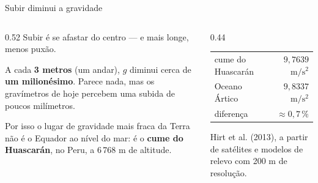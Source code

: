 \documentclass[aspectratio=169,11pt]{beamer}
\newcommand{\bnum}[1]{\textbf{\textcolor{mTeal}{#1}}}
\newcommand{\mss}{\ensuremath{\,\mathrm{m/s^2}}\xspace}
\begin{document}
\begin{frame}{Subir diminui a gravidade}
  \begin{columns}[T]
    \begin{column}{0.52\textwidth}
      Subir é se afastar do centro --- e mais longe, menos puxão.
      \medskip

      A cada \bnum{3 metros} (um andar), $g$ diminui cerca de \bnum{um milionésimo}. Parece
      nada, mas os gravímetros de hoje percebem uma subida de \alert{poucos milímetros}.
      \medskip

      Por isso o lugar de gravidade mais fraca da Terra não é o Equador ao nível do mar: é
      o \bnum{cume do Huascarán}, no Peru, a 6\,768 m de altitude.
    \end{column}
    \begin{column}{0.44\textwidth}
      \begin{ideia}[title={Os extremos do planeta}]
        \centering
        \small
        \renewcommand{\arraystretch}{1.3}
        \begin{tabular}{lr}
          cume do Huascarán & $9{,}7639$\mss \\
          Oceano Ártico & $9{,}8337$\mss \\
          \midrule
          diferença & $\approx 0{,}7\,\%$ \\
        \end{tabular}
      \end{ideia}
      \medskip
      {\scriptsize\textcolor{mStoneMid}{Hirt et al. (2013), a partir de satélites e modelos
      de relevo com 200 m de resolução.}}
    \end{column}
  \end{columns}
\end{frame}
\end{document}
